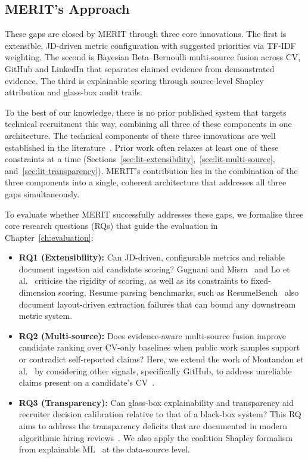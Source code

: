 \subsection*{MERIT's Approach}
\label{subsec:merit-approach}

These gaps are closed by MERIT through three core innovations. The first is extensible, 
JD-driven metric configuration with suggested priorities via TF-IDF weighting. The second 
is Bayesian Beta--Bernoulli multi-source fusion across CV, GitHub and LinkedIn that 
separates claimed evidence from demonstrated evidence. The third is explainable scoring 
through source-level Shapley attribution and glass-box audit trails. 

To the best of our knowledge, there is no prior published system that targets technical 
recruitment this way, combining all three of these components in one architecture. The 
technical components of these three innovations are well established in the 
literature~\cite{sparckjones1972idf, gelman2013bayesian, lundberg2017unified}. Prior 
work often relaxes at least one of these constraints at a time (Sections~\ref{sec:lit-extensibility},~\ref{sec:lit-multi-source}, and~\ref{sec:lit-transparency}). 
MERIT's contribution lies in the combination of the three components into a single, 
coherent architecture that addresses all three gaps simultaneously.

To evaluate whether MERIT successfully addresses these gaps, we formalise three core 
research questions (RQs) that guide the evaluation in Chapter~\ref{ch:evaluation}:

\begin{itemize}
    \item \textbf{RQ1 (Extensibility):} Can JD-driven, configurable metrics and 
    reliable document ingestion aid candidate scoring? Gugnani and Misra~\cite{gugnani2020} 
    and Lo et al.~\cite{lo2025aihiring} criticise the rigidity of scoring, as well as its 
    constraints to fixed-dimension scoring. Resume parsing benchmarks, such as 
    ResumeBench~\cite{emnlp2025resumebench} also document layout-driven extraction 
    failures that can bound any downstream metric system.
    
    \item \textbf{RQ2 (Multi-source):} Does evidence-aware multi-source fusion improve 
    candidate ranking over CV-only baselines when public work samples support or contradict 
    self-reported claims? Here, we extend the work of Montandon et al.~\cite{montandon2021_roles} 
    by considering other signals, specifically GitHub, to address unreliable claims present 
    on a candidate's CV~\cite{henle2019_resume_fraud,dunning2004}.
    
    \item \textbf{RQ3 (Transparency):} Can glass-box explainability and transparency aid 
    recruiter decision calibration relative to that of a black-box system? This RQ aims 
    to address the transparency deficits that are documented in modern algorithmic hiring 
    reviews~\cite{bogen2018,raghavan2020}. We also apply the coalition Shapley formalism 
    from explainable ML~\cite{lundberg2017unified} at the data-source level.
\end{itemize}
